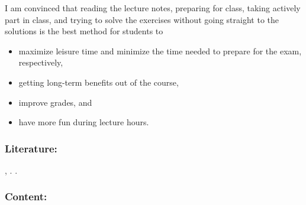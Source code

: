 \documentclass[
  12pt,
  oneside]{book}
\providecommand{\tightlist}{%
  \setlength{\itemsep}{0pt}\setlength{\parskip}{0pt}}
\theoremstyle{definition}
\theoremstyle{definition}
\theoremstyle{definition}
\theoremstyle{definition}
\theoremstyle{remark}
\begin{document}
I am convinced that reading the lecture notes, preparing for class, taking actively part in class, and trying to solve the exercises without going straight to the solutions is the best method for students to

\begin{itemize}
\tightlist
\item
  maximize leisure time and minimize the time needed to prepare for the exam, respectively,
\item
  getting long-term benefits out of the course,
\item
  improve grades, and
\item
  have more fun during lecture hours.
\end{itemize}

\hypertarget{literature}{%
\subsubsection*{Literature:}\label{literature}}

\citet{Cunningham2021Causal}, \citet{Huntington-Klein2022Effect}. \citet{Illowsky2018Introductory}. \citet{Bekes2021Data}

\hypertarget{content}{%
\subsubsection*{Content:}\label{content}}
\end{document}
